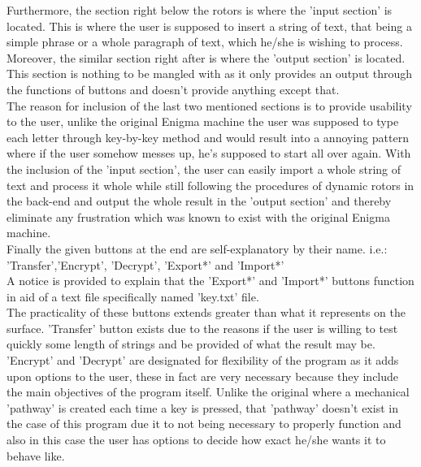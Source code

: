\documentclass[conference,compsoc]{IEEEtran}
\begin{document}
Furthermore, the section right below the rotors is where the 'input section' is located. This is where the user is supposed to insert a string of text, that being a simple phrase or a whole paragraph of text, which he/she is wishing to process.\\

Moreover, the similar section right after is where the 'output section' is located. This section is nothing to be mangled with as it only provides an output through the functions of buttons and doesn't provide anything except that.\\

The reason for inclusion of the last two mentioned sections is to provide usability to the user, unlike the original Enigma machine the user was supposed to type each letter through key-by-key method and would result into a annoying pattern where if the user somehow messes up, he's supposed to start all over again. With the inclusion of the 'input section', the user can easily import a whole string of text and process it whole while still following the procedures of dynamic rotors in the back-end and output the whole result in the 'output section' and thereby eliminate any frustration which was known to exist with the original Enigma machine.\\

Finally the given buttons at the end are self-explanatory by their name. i.e.: 'Transfer','Encrypt', 'Decrypt', 'Export*' and 'Import*'\\
A notice is provided to explain that the 'Export*' and 'Import*' buttons function in aid of a text file specifically named 'key.txt' file.\\

The practicality of these buttons extends greater than what it represents on the surface. 'Transfer' button exists due to the reasons if the user is willing to test quickly some length of strings and be provided of what the result may be.\\

'Encrypt' and 'Decrypt' are designated for flexibility of the program as it adds upon options to the user, these in fact are very necessary because they include the main objectives of the program itself. Unlike the original where a mechanical 'pathway' is created each time a key is pressed, that 'pathway' doesn't exist in the case of this program due it to not being necessary to properly function and also in this case the user has options to decide how exact he/she wants it to behave like.\\
\end{document}
